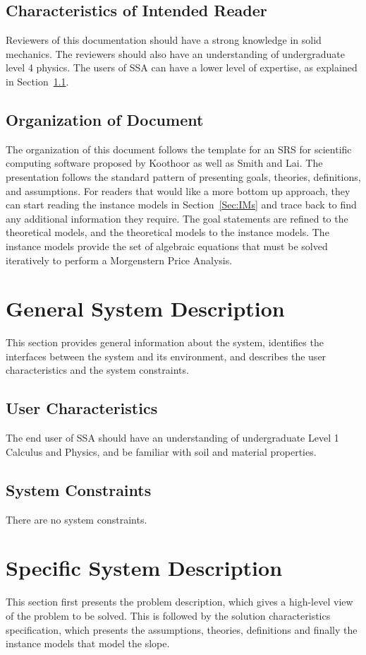 \documentclass[12pt]{article}
\begin{document}
\subsection{Characteristics of Intended Reader}
\label{Sec:ReaderChars}
Reviewers of this documentation should have a strong knowledge in solid mechanics. The reviewers should also have an understanding of undergraduate level 4 physics. The users of SSA can have a lower level of expertise, as explained in Section~\ref{Sec:UserChars}.
\subsection{Organization of Document}
\label{Sec:DocOrg}
The organization of this document follows the template for an SRS for scientific computing software proposed by Koothoor as well as Smith and Lai. The presentation follows the standard pattern of presenting goals, theories, definitions, and assumptions. For readers that would like a more bottom up approach, they can start reading the instance models in Section~\ref{Sec:IMs} and trace back to find any additional information they require.
The goal statements are refined to the theoretical models, and the theoretical models to the instance models. The instance models provide the set of algebraic equations that must be solved iteratively to perform a Morgenstern Price Analysis.
\section{General System Description}
\label{Sec:GenSysDesc}
This section provides general information about the system, identifies the interfaces between the system and its environment, and describes the user characteristics and the system constraints.
\subsection{User Characteristics}
\label{Sec:UserChars}
The end user of SSA should have an understanding of undergraduate Level 1 Calculus and Physics, and be familiar with soil and material properties.
\subsection{System Constraints}
\label{Sec:SysConstraints}
There are no system constraints.
\section{Specific System Description}
\label{Sec:SpecSystDesc}
This section first presents the problem description, which gives a high-level view of the problem to be solved. This is followed by the solution characteristics specification, which presents the assumptions, theories, definitions and finally the instance models that model the slope.
\end{document}
